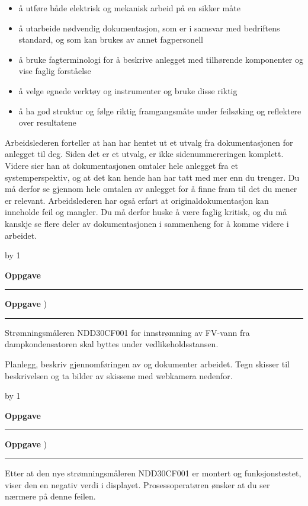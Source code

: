 \documentclass[12pt,a4paper]{article}
\def\oppgave{
            \advance\questnum by 1
	    \ifthenelse{\questnum>0\AND \questnum<9}
	    {
                \vskip 1cm
		\textbf{Oppgave}\hskip 5pt\the\questnum \hfill \hfill
		\vskip 3pt
		\hrule
	\vskip 0.5cm}
	{
                \vskip 1cm
		\textbf{Oppgave}\hskip 5pt \the\questnum \hfill \hfill)
		\vskip 3pt \hrule \vskip 0.5cm }

		}
\begin{document}
\begin{itemize}
	\item å utføre både elektrisk og mekanisk arbeid på en sikker måte 
	\item å utarbeide nødvendig dokumentasjon, som er i samsvar med bedriftens standard, og som kan brukes av annet fagpersonell  
	\item å bruke fagterminologi for å beskrive anlegget med tilhørende komponenter og vise faglig forståelse  
	\item å velge egnede verktøy og instrumenter og bruke disse riktig 
	\item å ha god struktur og følge riktig framgangsmåte under feilsøking og reflektere over resultatene 
\end{itemize}
\vskip 0.25cm
Arbeidslederen forteller at han har hentet ut et utvalg fra dokumentasjonen for anlegget til deg. Siden det er et utvalg, er ikke sidenummereringen komplett. Videre sier han at dokumentasjonen omtaler hele anlegget fra et systemperspektiv, og at det kan hende han har tatt med mer enn du trenger. Du må derfor se gjennom hele omtalen av anlegget for å finne fram til det du mener er relevant. Arbeidslederen har også erfart at originaldokumentasjon kan inneholde feil og mangler. Du må derfor huske å være faglig kritisk, og du må kanskje se flere deler av dokumentasjonen i sammenheng for å komme videre i arbeidet.



\newpage

\oppgave{}%
Strømningsmåleren NDD30CF001 for innstrømning av FV-vann fra dampkondensatoren skal byttes under vedlikeholdsstansen. 

\vskip 0.25cm
Planlegg, beskriv gjennomføringen av og dokumenter arbeidet. Tegn skisser til beskrivelsen og ta bilder av skissene med webkamera nedenfor.
\vskip 0.25cm
\oppgave{}%
Etter at den nye strømningsmåleren NDD30CF001 er montert og funksjonstestet, viser den en negativ verdi i displayet. Prosessoperatøren ønsker at du ser nærmere på denne feilen. 
\end{document}
